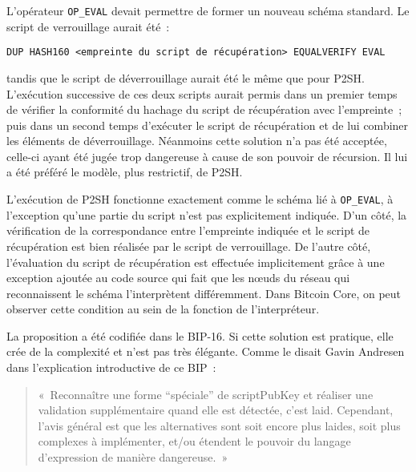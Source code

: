 L'opérateur \texttt{OP\_EVAL} devait permettre de former un nouveau schéma standard. Le script de verrouillage aurait été~:

\begin{Verbatim}[fontsize=\footnotesize]
DUP HASH160 <empreinte du script de récupération> EQUALVERIFY EVAL
\end{Verbatim}

tandis que le script de déverrouillage aurait été le même que pour P2SH. L'exécution successive de ces deux scripts aurait permis dans un premier temps de vérifier la conformité du hachage du script de récupération avec l'empreinte~; puis dans un second temps d'exécuter le script de récupération et de lui combiner les éléments de déverrouillage. Néanmoins cette solution n'a pas été acceptée, celle-ci ayant été jugée trop dangereuse à cause de son pouvoir de récursion. Il lui a été préféré le modèle, plus restrictif, de P2SH.

L'exécution de P2SH fonctionne exactement comme le schéma lié à \texttt{OP\_EVAL}, à l'exception qu'une partie du script n'est pas explicitement indiquée. D'un côté, la vérification de la correspondance entre l'empreinte indiquée et le script de récupération est bien réalisée par le script de verrouillage. De l'autre côté, l'évaluation du script de récupération est effectuée implicitement grâce à une exception ajoutée au code source qui fait que les nœuds du réseau qui reconnaissent le schéma l'interprètent différemment. Dans Bitcoin Core, on peut observer cette condition au sein de la fonction  de l'interpréteur.

La proposition a été codifiée dans le BIP-16. Si cette solution est pratique, elle crée de la complexité et n'est pas très élégante. Comme le disait Gavin Andresen dans l'explication introductive de ce BIP~:

\begin{quote}
«~Reconnaître une forme “spéciale” de scriptPubKey et réaliser une validation supplémentaire quand elle est détectée, c'est laid. Cependant, l'avis général est que les alternatives sont soit encore plus laides, soit plus complexes à implémenter, et/ou étendent le pouvoir du langage d'expression de manière dangereuse.~»
\end{quote}

